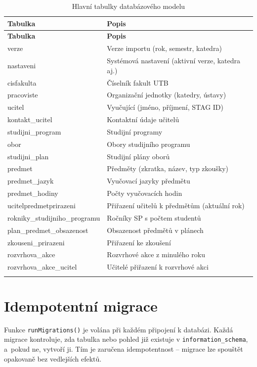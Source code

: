 \documentclass[12pt,a4paper]{report}
\begin{document}
\begin{longtable}{>{\ttfamily}lp{8cm}}
  \toprule
  \textbf{Tabulka} & \textbf{Popis} \\
  \midrule
  \endfirsthead
  \midrule
  \textbf{Tabulka} & \textbf{Popis} \\
  \midrule
  \endhead
  verze & Verze importu (rok, semestr, katedra) \\
  nastaveni & Systémová nastavení (aktivní verze, katedra aj.) \\
  cisfakulta & Číselník fakult UTB \\
  pracoviste & Organizační jednotky (katedry, ústavy) \\
  ucitel & Vyučující (jméno, příjmení, STAG ID) \\
  kontakt\_ucitel & Kontaktní údaje učitelů \\
  studijni\_program & Studijní programy \\
  obor & Obory studijního programu \\
  studijni\_plan & Studijní plány oborů \\
  predmet & Předměty (zkratka, název, typ zkoušky) \\
  predmet\_jazyk & Vyučovací jazyky předmětu \\
  predmet\_hodiny & Počty vyučovacích hodin \\
  ucitelpredmetprirazeni & Přiřazení učitelů k předmětům (aktuální rok) \\
  rokniky\_studijniho\_programu & Ročníky SP s počtem studentů \\
  plan\_predmet\_obsazenost & Obsazenost předmětů v plánech \\
  zkouseni\_prirazeni & Přiřazení ke zkoušení \\
  rozvrhova\_akce & Rozvrhové akce z minulého roku \\
  rozvrhova\_akce\_ucitel & Učitelé přiřazení k rozvrhové akci \\
  \bottomrule
  \caption{Hlavní tabulky databázového modelu}
\end{longtable}

\section{Idempotentní migrace}

Funkce \texttt{runMigrations()} je volána při každém připojení k databázi. Každá migrace kontroluje, zda tabulka nebo pohled již existuje v \texttt{information\_schema}, a~pokud ne, vytvoří ji. Tím je zaručena idempotentnost -- migrace lze spouštět opakovaně bez vedlejších efektů.
\end{document}
